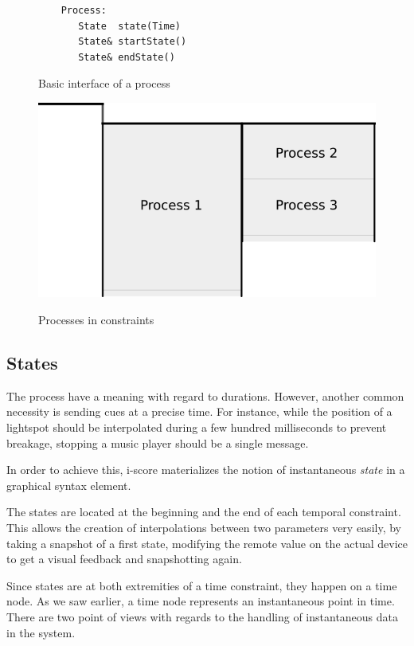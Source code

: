 \documentclass{sigchi}
\begin{document}
\begin{figure}
	\centering
\begin{lstlisting}
    Process:
       State  state(Time)
       State& startState()
       State& endState()
\end{lstlisting}
\caption{Basic interface of a process}
\label{fig.processInterface}
\end{figure}
\begin{figure}
	\centering
	\includegraphics[scale=0.5]{images/processes.png}
	\label{fig.processes}
	\caption{Processes in constraints}
\end{figure}


\subsection{States}
The process have a meaning with regard to durations. However, another common necessity is sending cues at a precise time. For instance, while the position of a lightspot should be interpolated during a few hundred milliseconds to prevent breakage, stopping a music player should be a single message.

In order to achieve this, i-score materializes the notion of instantaneous \textit{state} in a graphical syntax element.

The states are located at the beginning and the end of each temporal constraint. This allows the creation of interpolations between two parameters very easily, by taking a snapshot of a first state, modifying the remote value on the actual device to get a visual feedback and snapshotting again. 

Since states are at both extremities of a time constraint, they happen on a time node. As we saw earlier, a time node represents an instantaneous point in time. 
There are two point of views with regards to the handling of instantaneous data in the system.
\end{document}
